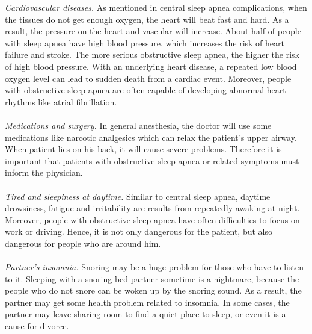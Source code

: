     \textit{Cardiovascular diseases.} As mentioned in central sleep apnea complications, when the tissues do not get enough oxygen, the heart will beat fast and hard. As a result, the pressure on the heart and vascular will increase. About half of people with sleep apnea have high blood pressure, which increases the risk of heart failure and stroke. The more serious obstructive sleep apnea, the higher the risk of high blood pressure. With an underlying heart disease, a repeated low blood oxygen level can lead to sudden death from a cardiac event. Moreover, people with obstructive sleep apnea are often capable of developing abnormal heart rhythms like atrial fibrillation. \\\\
    \textit{Medications and surgery.} In general anesthesia, the doctor will use some medications like narcotic analgesics which can relax the patient's upper airway. When patient lies on his back, it will cause severe problems. Therefore it is important that patients with obstructive sleep apnea or related symptoms must inform the physician.\\\\
    \textit{Tired and sleepiness at daytime.} Similar to central sleep apnea, daytime drowsiness, fatigue and irritability are results from repeatedly awaking at night. Moreover, people with obstructive sleep apnea have often difficulties to focus on work or driving. Hence, it is not only dangerous for the patient, but also dangerous for people who are around him.\\\\
    \textit{Partner's insomnia.} Snoring may be a huge problem for those who have to listen to it. Sleeping with a snoring bed partner sometime is a nightmare, because the people who do not snore can be woken up by the snoring sound. As a result, the partner may get some health problem related to insomnia. In some cases, the partner may leave sharing room to find a quiet place to sleep, or even it is a cause for divorce.\\\\
    
